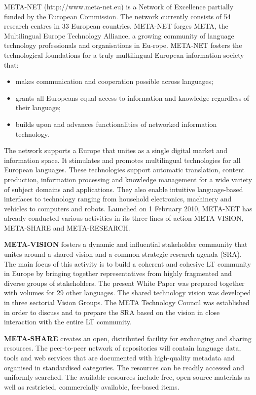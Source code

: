 \begin{multicols}{2}

META-NET (http://www.meta-net.eu) is a Network of Excellence partially funded by the European Commission. The network currently consists of 54 research centres in 33 European countries\cite{rehm2011}. META-NET forges META, the Multilingual Europe Technology Alliance, a growing community of language technology professionals and organisations in Eu-rope. META-NET fosters the technological foundations for a truly multilingual European information society that:

\begin{itemize}
\item makes communication and cooperation possible across languages;
\item grants all Europeans equal access to information and knowledge regardless of their language;
\item builds upon and advances functionalities of networked information technology.
\end{itemize}

The network supports a Europe that unites as a single digital market and information space. It stimulates and promotes multilingual technologies for all European languages. These technologies support automatic translation, content production, information processing and knowledge management for a wide variety of subject domains and applications. They also enable intuitive language-based interfaces to technology ranging from household electronics, machinery and vehicles to computers and robots.
Launched on 1 February 2010, META-NET has already conducted various activities in its three lines of action META-VISION, META-SHARE and META-RESEARCH.

\textbf{META-VISION} fosters a dynamic and influential stakeholder community that unites around a shared vision and a common strategic research agenda (SRA). The main focus of this activity is to build a coherent and cohesive LT community in Europe by bringing together representatives from highly fragmented and diverse groups of stakeholders. The present White Paper was prepared together with volumes for 29 other languages. The shared technology vision was developed in three sectorial Vision Groups. The META Technology Council was established in order to discuss and to prepare the SRA based on the vision in close interaction with the entire LT community.

\textbf{META-SHARE} creates an open, distributed facility for exchanging and sharing resources. The peer-to-peer network of repositories will contain language data, tools and web services that are documented with high-quality metadata and organised in standardised categories. The resources can be readily accessed and uniformly searched. The available resources include free, open source materials as well as restricted, commercially available, fee-based items.


\end{multicols}
